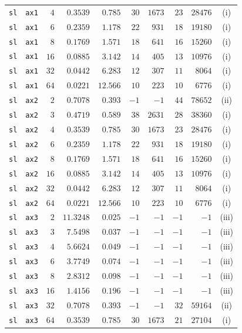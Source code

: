 \begin{longtable}{llrrrrrrrc}
\texttt{sl} & \texttt{ax1} & $4$ & $0.3539$ & $0.785$ & $30$ & $1673$ & $23$ & $28476$ & (i) \\
\texttt{sl} & \texttt{ax1} & $6$ & $0.2359$ & $1.178$ & $22$ & $931$ & $18$ & $19180$ & (i) \\
\texttt{sl} & \texttt{ax1} & $8$ & $0.1769$ & $1.571$ & $18$ & $641$ & $16$ & $15260$ & (i) \\
\texttt{sl} & \texttt{ax1} & $16$ & $0.0885$ & $3.142$ & $14$ & $405$ & $13$ & $10976$ & (i) \\
\texttt{sl} & \texttt{ax1} & $32$ & $0.0442$ & $6.283$ & $12$ & $307$ & $11$ & $8064$ & (i) \\
\texttt{sl} & \texttt{ax1} & $64$ & $0.0221$ & $12.566$ & $10$ & $223$ & $10$ & $6776$ & (i) \\
\texttt{sl} & \texttt{ax2} & $2$ & $0.7078$ & $0.393$ & $-1$ & $-1$ & $44$ & $78652$ & (ii) \\
\texttt{sl} & \texttt{ax2} & $3$ & $0.4719$ & $0.589$ & $38$ & $2631$ & $28$ & $38360$ & (i) \\
\texttt{sl} & \texttt{ax2} & $4$ & $0.3539$ & $0.785$ & $30$ & $1673$ & $23$ & $28476$ & (i) \\
\texttt{sl} & \texttt{ax2} & $6$ & $0.2359$ & $1.178$ & $22$ & $931$ & $18$ & $19180$ & (i) \\
\texttt{sl} & \texttt{ax2} & $8$ & $0.1769$ & $1.571$ & $18$ & $641$ & $16$ & $15260$ & (i) \\
\texttt{sl} & \texttt{ax2} & $16$ & $0.0885$ & $3.142$ & $14$ & $405$ & $13$ & $10976$ & (i) \\
\texttt{sl} & \texttt{ax2} & $32$ & $0.0442$ & $6.283$ & $12$ & $307$ & $11$ & $8064$ & (i) \\
\texttt{sl} & \texttt{ax2} & $64$ & $0.0221$ & $12.566$ & $10$ & $223$ & $10$ & $6776$ & (i) \\
\texttt{sl} & \texttt{ax3} & $2$ & $11.3248$ & $0.025$ & $-1$ & $-1$ & $-1$ & $-1$ & (iii) \\
\texttt{sl} & \texttt{ax3} & $3$ & $7.5498$ & $0.037$ & $-1$ & $-1$ & $-1$ & $-1$ & (iii) \\
\texttt{sl} & \texttt{ax3} & $4$ & $5.6624$ & $0.049$ & $-1$ & $-1$ & $-1$ & $-1$ & (iii) \\
\texttt{sl} & \texttt{ax3} & $6$ & $3.7749$ & $0.074$ & $-1$ & $-1$ & $-1$ & $-1$ & (iii) \\
\texttt{sl} & \texttt{ax3} & $8$ & $2.8312$ & $0.098$ & $-1$ & $-1$ & $-1$ & $-1$ & (iii) \\
\texttt{sl} & \texttt{ax3} & $16$ & $1.4156$ & $0.196$ & $-1$ & $-1$ & $-1$ & $-1$ & (iii) \\
\texttt{sl} & \texttt{ax3} & $32$ & $0.7078$ & $0.393$ & $-1$ & $-1$ & $32$ & $59164$ & (ii) \\
\texttt{sl} & \texttt{ax3} & $64$ & $0.3539$ & $0.785$ & $30$ & $1673$ & $21$ & $27104$ & (i) \\
\end{longtable}
